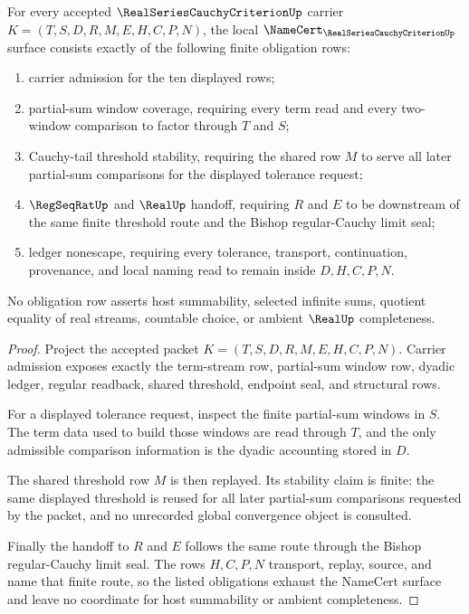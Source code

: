 \begin{theorem}\label{thm:real-series-cauchy-criterion-obligation-surface}
For every accepted $\RealSeriesCauchyCriterionUp$ carrier $K=(T,S,D,R,M,E,H,C,P,N)$, the local $\NameCert_{\RealSeriesCauchyCriterionUp}$ surface consists exactly of the following finite obligation rows:
\begin{enumerate}
\item carrier admission for the ten displayed rows;
\item partial-sum window coverage, requiring every term read and every two-window comparison to factor through $T$ and $S$;
\item Cauchy-tail threshold stability, requiring the shared row $M$ to serve all later partial-sum comparisons for the displayed tolerance request;
\item $\RegSeqRatUp$ and $\RealUp$ handoff, requiring $R$ and $E$ to be downstream of the same finite threshold route and the Bishop regular-Cauchy limit seal;
\item ledger nonescape, requiring every tolerance, transport, continuation, provenance, and local naming read to remain inside $D,H,C,P,N$.
\end{enumerate}
No obligation row asserts host summability, selected infinite sums, quotient equality of real streams, countable choice, or ambient $\RealUp$ completeness.
\end{theorem}
\begin{proof}
Project the accepted packet $K=(T,S,D,R,M,E,H,C,P,N)$. Carrier admission exposes exactly the term-stream row, partial-sum window row, dyadic ledger, regular readback, shared threshold, endpoint seal, and structural rows.

For a displayed tolerance request, inspect the finite partial-sum windows in $S$. The term data used to build those windows are read through $T$, and the only admissible comparison information is the dyadic accounting stored in $D$.

The shared threshold row $M$ is then replayed. Its stability claim is finite: the same displayed threshold is reused for all later partial-sum comparisons requested by the packet, and no unrecorded global convergence object is consulted.

Finally the handoff to $R$ and $E$ follows the same route through the Bishop regular-Cauchy limit seal. The rows $H,C,P,N$ transport, replay, source, and name that finite route, so the listed obligations exhaust the NameCert surface and leave no coordinate for host summability or ambient completeness.
\end{proof}

